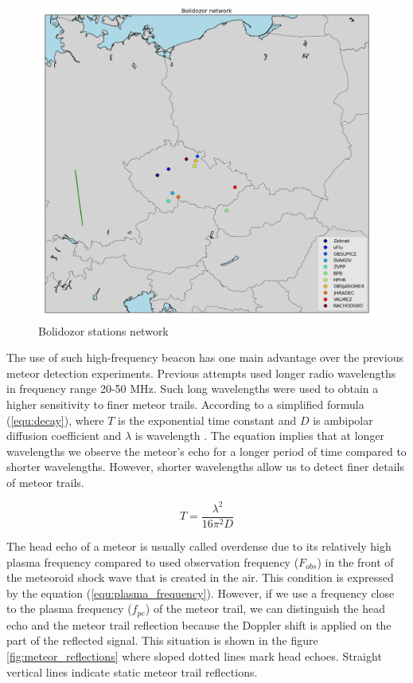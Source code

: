 \documentclass[twoside]{ctuthesis}
\theoremstyle{plain}
\theoremstyle{definition}
\theoremstyle{note}
\begin{document}
\begin{figure}
 \begin{center}
 \includegraphics[width=\linewidth]{./img/stanice_mapa.png}
 \caption{Bolidozor stations network}
  \label{fig:stanice_mapa} 
 \end{center}
\end{figure}
                   
The use of such high-frequency beacon has one main advantage over the previous meteor detection experiments.
Previous attempts used longer radio wavelengths in frequency range 20-50 MHz. Such long wavelengths were used to obtain a higher sensitivity to finer meteor trails. According to a simplified formula (\ref{equ:decay}), where $T$ is the exponential time constant and $D$ is ambipolar diffusion coefficient and $\lambda$ is wavelength \cite{Decay_time}. The equation implies that at longer wavelengths we observe the meteor's echo for a longer period of time compared to shorter wavelengths. However, shorter wavelengths allow us to detect finer details of meteor trails.

\begin{equation}
T = \frac{\lambda^2}{16 \pi ^2 D}
\label{equ:decay}
\end{equation}

The head echo of a meteor is usually called overdense due to its relatively high plasma frequency compared to used observation frequency ($F_{obs}$) in the front of the meteoroid shock wave that is created in the air. This condition is expressed by the equation (\ref{equ:plasma_frequency}). However, if we use a frequency close to the plasma frequency ($f_{pe}$) of the meteor trail, we can distinguish the head echo and the meteor trail reflection because the Doppler shift is applied on the part of the reflected signal. This situation is shown in the figure \ref{fig:meteor_reflections} where sloped dotted lines mark head echoes. Straight vertical lines indicate static meteor trail reflections.
\end{document}
